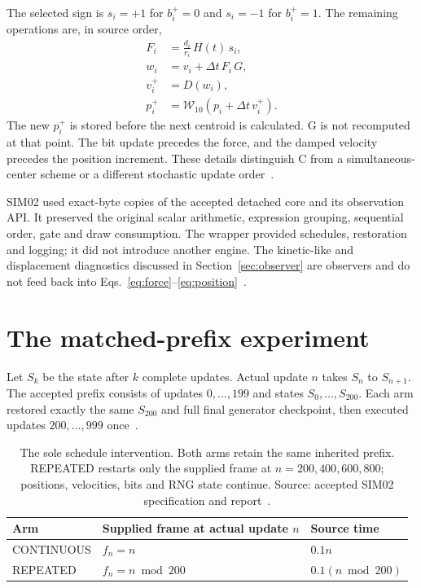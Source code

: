 \documentclass[11pt,a4paper]{article}
\newcommand{\wrap}{\mathcal W_{10}}
\begin{document}
The selected sign is $s_i=+1$ for $b_i^+=0$ and $s_i=-1$ for $b_i^+=1$. The remaining operations are, in source order,
\begin{align}
 F_i&=\frac{d_i}{r_i}\,H(t)\,s_i,\label{eq:force}\\
 w_i&=v_i+\Delta t\,F_i\,G,\label{eq:predamp}\\
 v_i^+&=D(w_i),\label{eq:velocity}\\
 p_i^+&=\wrap\!\left(p_i+\Delta t\,v_i^+\right).\label{eq:position}
\end{align}
The new $p_i^+$ is stored before the next centroid is calculated. G is not recomputed at that point. The bit update precedes the force, and the damped velocity precedes the position increment. These details distinguish C from a simultaneous-center scheme or a different stochastic update order~\cite{source}.

SIM02 used exact-byte copies of the accepted detached core and its observation API. It preserved the original scalar arithmetic, expression grouping, sequential order, gate and draw consumption. The wrapper provided schedules, restoration and logging; it did not introduce another engine. The kinetic-like and displacement diagnostics discussed in Section~\ref{sec:observer} are observers and do not feed back into Eqs.~\eqref{eq:force}--\eqref{eq:position}~\cite{sim02,review}.

\section{The matched-prefix experiment}
\label{sec:design}
Let $S_k$ be the state after $k$ complete updates. Actual update $n$ takes $S_n$ to $S_{n+1}$. The accepted prefix consists of updates $0,\ldots,199$ and states $S_0,\ldots,S_{200}$. Each arm restored exactly the same $S_{200}$ and full final generator checkpoint, then executed updates $200,\ldots,999$ once~\cite{sim02}.

\begin{table}[htbp]
\centering\small
\begin{tabular}{lll}
\toprule Arm & Supplied frame at actual update $n$ & Source time \\
\midrule CONTINUOUS & $f_n=n$ & $0.1n$ \\
REPEATED & $f_n=n\bmod200$ & $0.1(n\bmod200)$ \\
\bottomrule
\end{tabular}
\caption{The sole schedule intervention. Both arms retain the same inherited prefix. REPEATED restarts only the supplied frame at $n=200,400,600,800$; positions, velocities, bits and RNG state continue. Source: accepted SIM02 specification and report~\cite{sim02}.}
\label{tab:schedule}
\end{table}
\end{document}
